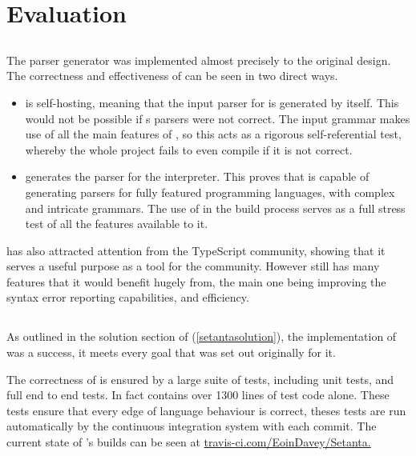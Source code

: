 \chapter{Evaluation}

\section{\tsPEG{}}

The \tsPEG{} parser generator was implemented almost precisely to the original design. The correctness and effectiveness of \tsPEG{} can be seen in two direct ways.
\begin{itemize}
    \item \tsPEG{} is self-hosting, meaning that the input parser for \tsPEG{} is generated by \tsPEG{} itself. This would not be possible if \tsPEG{}s parsers were not correct. The input grammar makes use of all the main features of \tsPEG{}, so this acts as a rigorous self-referential test, whereby the whole project fails to even compile if it is not correct.
    \item \tsPEG{} generates the parser for the \Setanta{} interpreter. This proves that \tsPEG{} is capable of generating parsers for fully featured programming languages, with complex and intricate grammars. The use of \tsPEG{} in the \Setanta{} build process serves as a full stress test of all the features available to it.
\end{itemize}

\tsPEG{} has also attracted attention from the TypeScript community, showing that it serves a useful purpose as a tool for the community. However \tsPEG{} still has many features that it would benefit hugely from, the main one being improving the syntax error reporting capabilities, and efficiency.

\section{\Setanta{}}

As outlined in the solution section of \Setanta{} (\ref{setantasolution}), the implementation of \Setanta{} was a success, it meets every goal that was set out originally for it.

The correctness of \Setanta{} is ensured by a large suite of tests, including unit tests, and full end to end tests. In fact \Setanta{} contains over 1300 lines of test code alone. These tests ensure that every edge of language behaviour is correct, theses tests are run automatically by the continuous integration system with each commit. The current state of \Setanta{}'s builds can be seen at \href{https://travis-ci.com/EoinDavey/Setanta}{travis-ci.com/EoinDavey/Setanta.}

